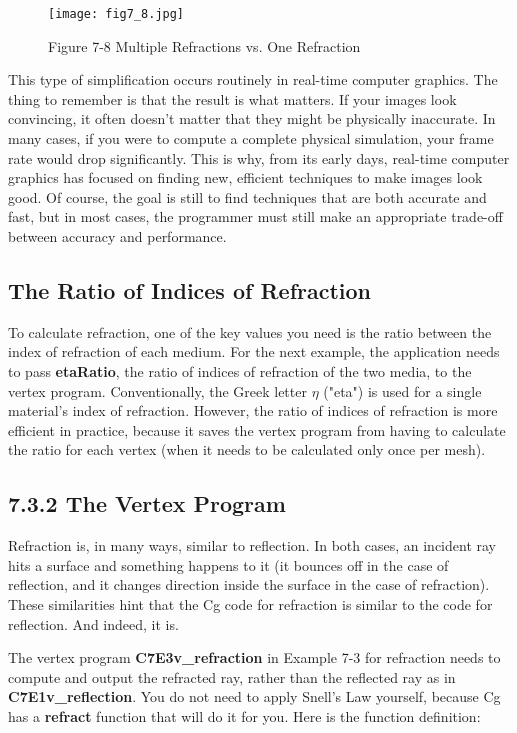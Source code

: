 \documentclass[../main.tex]{subfiles}
\begin{document}
\begin{figure}
    \centering
    \texttt{[image: fig7\_8.jpg]}
    \caption{Figure 7-8 Multiple Refractions vs. One Refraction}
    \label{fig:7-8}
\end{figure}

This type of simplification occurs routinely in real-time computer graphics. The thing to remember is that the result is what matters. If your images look convincing, it often doesn't matter that they might be physically inaccurate. In many cases, if you were to compute a complete physical simulation, your frame rate would drop significantly. This is why, from its early days, real-time computer graphics has focused on finding new, efficient techniques to make images look good. Of course, the goal is still to find techniques that are both accurate and fast, but in most cases, the programmer must still make an appropriate trade-off between accuracy and performance.

\subsection*{The Ratio of Indices of Refraction}

To calculate refraction, one of the key values you need is the ratio between the index of refraction of each medium. For the next example, the application needs to pass \textbf{etaRatio}, the ratio of indices of refraction of the two media, to the vertex program. Conventionally, the Greek letter $\eta$ ("eta") is used for a single material's index of refraction. However, the ratio of indices of refraction is more efficient in practice, because it saves the vertex program from having to calculate the ratio for each vertex (when it needs to be calculated only once per mesh).

\subsection{7.3.2 The Vertex Program}

Refraction is, in many ways, similar to reflection. In both cases, an incident ray hits a surface and something happens to it (it bounces off in the case of reflection, and it changes direction inside the surface in the case of refraction). These similarities hint that the Cg code for refraction is similar to the code for reflection. And indeed, it is.

The vertex program \textbf{C7E3v_refraction} in Example 7-3 for refraction needs to compute and output the refracted ray, rather than the reflected ray as in \textbf{C7E1v_reflection}. You do not need to apply Snell's Law yourself, because Cg has a \textbf{refract} function that will do it for you. Here is the function definition:
\end{document}
